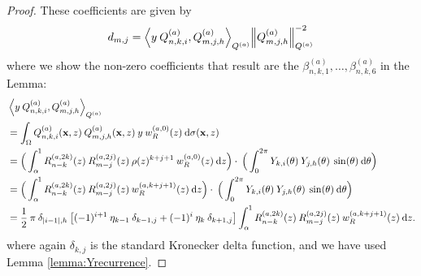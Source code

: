 \documentclass[11pt, oneside]{article}   	%
\newcommand{\half}{\frac{1}{2}}
\newcommand{\genjac}{R}
\newcommand{\genjacnmk}{\genjac_{n-k}}
\newcommand{\genjacmmj}{\genjac_{m-j}}
\newcommand{\genjacw}{w_\genjac}
\newcommand{\scop}{Q}
\newcommand{\scopnki}{\scop_{n,k,i}}
\newcommand{\scopmjh}{\scop_{m,j,h}}
\newcommand{\scopa}{\scop^{(a)}}
\newcommand{\scopnkia}{\scopnki^{(a)}}
\newcommand{\scopmjha}{\scopmjh^{(a)}}
\newcommand{\xvec}{\mathbf{x}}
\newcommand{\ch}{Y}
\newcommand{\chki}{\ch_{k,i}}
\newcommand{\chjh}{\ch_{j,h}}
\newcommand{\betaa}{\beta^{(a)}}
\begin{document}
\begin{proof}
These coefficients are given by
\begin{align*}
	d_{m,j} = {\ip< y \: \scopnkia, \scopmjha >_{\scopa}}{\norm{\scopmjha}^{-2}_{\scopa}}
\end{align*}
where we show the non-zero coefficients that result are the $\betaa_{n,k,1},\dots,\betaa_{n,k,6}$ in the Lemma:
\begin{align*}
	&\ip<y \: \scopnkia, \scopmjha>_{\scopa} \\
	&= \int_\Omega \scopnkia(\xvec,z) \: \scopmjha(\xvec,z) \: y \: \genjacw^{(a,0)}(z) \: \D\sigma(\xvec, z) \\
	&= \Big( \int^1_\alpha \genjacnmk^{(a, 2k)}(z) \: \genjacmmj^{(a, 2j)}(z) \: \rho(z)^{k+j+1} \: \genjacw^{(a, 0)}(z) \: \D z \Big) \cdot \: \Big( \int_0^{2\pi} \chki(\theta) \: \chjh(\theta) \: \sin(\theta) \: \D \theta \Big) \\
	&= \Big( \int^1_\alpha \genjacnmk^{(a, 2k)}(z) \: \genjacmmj^{(a, 2j)}(z) \: \genjacw^{(a, k + j + 1)}(z) \: \D z \Big) \cdot \: \Big( \int_0^{2\pi} \chki(\theta) \: \chjh(\theta) \: \sin(\theta) \: \D \theta \Big) \\
	&= \half \: \pi \: \delta_{|i-1|,h} \: \big[(-1)^{i+1} \: \eta_{k-1} \: \delta_{k-1, j} + (-1)^i \: \eta_{k} \: \delta_{k+1, j}\big] \int^1_\alpha \genjacnmk^{(a, 2k)}(z) \: \genjacmmj^{(a, 2j)}(z) \: \genjacw^{(a, k + j + 1)}(z) \: \D z.
\end{align*}
where again $\delta_{k, j}$ is the standard Kronecker delta function, and we have used Lemma \ref{lemma:Yrecurrence}.

\end{proof}
\end{document}
